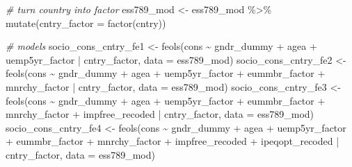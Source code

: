 \documentclass[
]{article}
\newenvironment{Shaded}{\begin{snugshade}}{\end{snugshade}}
\newcommand{\AttributeTok}[1]{\textcolor[rgb]{0.77,0.63,0.00}{#1}}
\newcommand{\CommentTok}[1]{\textcolor[rgb]{0.56,0.35,0.01}{\textit{#1}}}
\newcommand{\FunctionTok}[1]{\textcolor[rgb]{0.00,0.00,0.00}{#1}}
\newcommand{\NormalTok}[1]{#1}
\newcommand{\OtherTok}[1]{\textcolor[rgb]{0.56,0.35,0.01}{#1}}
\newcommand{\SpecialCharTok}[1]{\textcolor[rgb]{0.00,0.00,0.00}{#1}}
\begin{document}
\begin{Shaded}
\begin{Highlighting}[]
\CommentTok{\# turn country into factor }
\NormalTok{ess789\_mod }\OtherTok{\textless{}{-}}\NormalTok{ ess789\_mod }\SpecialCharTok{\%\textgreater{}\%}
  \FunctionTok{mutate}\NormalTok{(}\AttributeTok{cntry\_factor =} \FunctionTok{factor}\NormalTok{(cntry))}

\CommentTok{\# models}
\NormalTok{socio\_cons\_cntry\_fe1 }\OtherTok{\textless{}{-}} \FunctionTok{feols}\NormalTok{(cons }\SpecialCharTok{\textasciitilde{}}\NormalTok{ gndr\_dummy }\SpecialCharTok{+}\NormalTok{ agea }\SpecialCharTok{+}\NormalTok{ uemp5yr\_factor }\SpecialCharTok{|}\NormalTok{ cntry\_factor, }
                              \AttributeTok{data =}\NormalTok{ ess789\_mod)}
\NormalTok{socio\_cons\_cntry\_fe2 }\OtherTok{\textless{}{-}} \FunctionTok{feols}\NormalTok{(cons }\SpecialCharTok{\textasciitilde{}}\NormalTok{ gndr\_dummy }\SpecialCharTok{+}\NormalTok{ agea }\SpecialCharTok{+}\NormalTok{ uemp5yr\_factor }\SpecialCharTok{+} 
\NormalTok{                              eummbr\_factor }\SpecialCharTok{+}\NormalTok{ mnrchy\_factor }\SpecialCharTok{|}\NormalTok{ cntry\_factor, }
                              \AttributeTok{data =}\NormalTok{ ess789\_mod)}
\NormalTok{socio\_cons\_cntry\_fe3 }\OtherTok{\textless{}{-}} \FunctionTok{feols}\NormalTok{(cons }\SpecialCharTok{\textasciitilde{}}\NormalTok{ gndr\_dummy }\SpecialCharTok{+}\NormalTok{ agea }\SpecialCharTok{+}\NormalTok{ uemp5yr\_factor }\SpecialCharTok{+} 
\NormalTok{                              eummbr\_factor }\SpecialCharTok{+}\NormalTok{ mnrchy\_factor }\SpecialCharTok{+}\NormalTok{ impfree\_recoded }\SpecialCharTok{|}\NormalTok{ cntry\_factor, }
                              \AttributeTok{data =}\NormalTok{ ess789\_mod)}
\NormalTok{socio\_cons\_cntry\_fe4 }\OtherTok{\textless{}{-}} \FunctionTok{feols}\NormalTok{(cons }\SpecialCharTok{\textasciitilde{}}\NormalTok{ gndr\_dummy }\SpecialCharTok{+}\NormalTok{ agea }\SpecialCharTok{+}\NormalTok{ uemp5yr\_factor }\SpecialCharTok{+} 
\NormalTok{                              eummbr\_factor }\SpecialCharTok{+}\NormalTok{ mnrchy\_factor }\SpecialCharTok{+}\NormalTok{ impfree\_recoded }\SpecialCharTok{+}\NormalTok{ ipeqopt\_recoded }\SpecialCharTok{|}\NormalTok{ cntry\_factor, }
                              \AttributeTok{data =}\NormalTok{ ess789\_mod)}


\end{Highlighting}
\end{Shaded}
\end{document}
